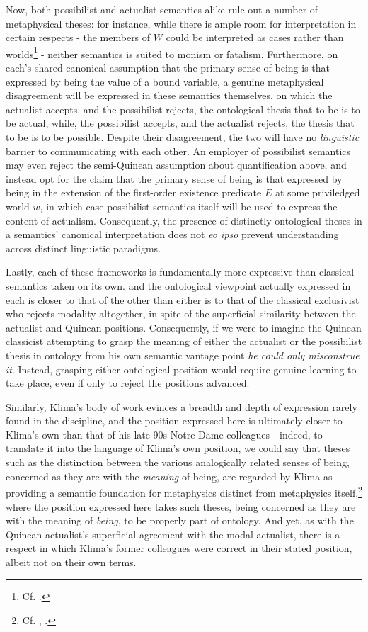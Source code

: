 \documentclass[]{article}
\begin{document}
Now, 
both possibilist and actualist semantics alike rule out a number of metaphysical theses: 
for instance, while there is ample room for interpretation in certain respects - 
the members of $W$ could be interpreted as cases rather than worlds\footnote{Cf. \autocite{CIFOL1,CIFOL2}.} - 
neither semantics is suited to monism or fatalism. 
Furthermore, 
on each's shared canonical assumption that the primary sense of being is that expressed by being the value of a bound variable, 
a genuine metaphysical disagreement will be expressed in these semantics themselves, 
on which the actualist accepts, 
and the possibilist rejects, 
the ontological thesis that to be is to be actual, 
while, the possibilist accepts, 
and the actualist rejects, 
the thesis that to be is to be possible. 
Despite their disagreement, the two will have no \emph{linguistic} barrier to communicating with each other. 
An employer of possibilist semantics may even reject the semi-Quinean assumption about quantification above, 
and instead opt for the claim 
that the primary sense of being is that expressed by being in the extension of the first-order existence predicate $E$ at some priviledged world $w$, 
in which case possibilist semantics itself will be used to express the content of actualism. 
Consequently, the presence of distinctly ontological theses in a semantics' canonical interpretation does not 
\emph{eo ipso} prevent understanding across distinct linguistic paradigms.  

Lastly, 
each of these frameworks is fundamentally more expressive than classical semantics taken on its own.
and the ontological viewpoint actually expressed in each is closer to that of the other than either is to that of the classical exclusivist who rejects modality altogether, 
in spite of the superficial similarity between the actualist and Quinean positions. 
Consequently, if we were to imagine the Quinean classicist attempting to grasp the meaning of either the actualist or the possibilist thesis in ontology 
from his own semantic vantage point
\emph{he could only misconstrue it}. 
Instead, grasping either ontological position would require genuine learning to take place, 
even if only to reject the positions advanced. 

Similarly, 
Klima's body of work evinces a breadth and depth of expression rarely found in the discipline, 
and 
the position expressed here is ultimately closer to Klima's own than that of his late 90s Notre Dame colleagues - 
indeed, to translate it into the language of Klima's own position, 
we could say that theses such as the distinction between the various analogically related senses of being, 
concerned as they are with the \emph{meaning} of being, 
are regarded by Klima as providing a semantic foundation for metaphysics distinct from metaphysics itself,\footnote{Cf. \autocite[88]{Klima1996}, \autocite[49]{Klima2011b}.}
where the position expressed here takes such theses, 
being concerned as they are with the meaning of \emph{being},
to be properly part of ontology. 
And yet, 
as with the Quinean actualist's superficial agreement with the modal actualist, 
there is a respect in which Klima's former colleagues were correct in their stated position, 
albeit not on their own terms. 
\end{document}
